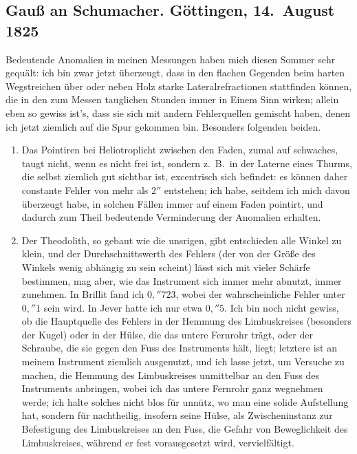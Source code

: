 \documentclass[12pt,a4paper]{article}
\theoremstyle{plain}
\theoremstyle{definition}
\theoremstyle{remark}
\begin{document}
\vfill
\eject

\subsection*{Gau\ss{} an Schumacher. G\"ottingen, 14.\ August 1825}

Bedeutende Anomalien in meinen Messungen haben mich diesen Sommer sehr gequ\"alt: ich bin zwar jetzt \"uberzeugt, dass in den flachen Gegenden beim harten Wegstreichen \"uber oder neben Holz starke Lateralrefractionen stattfinden k\"onnen, die in den zum Messen tauglichen Stunden immer in Einem Sinn wirken; allein eben so gewiss ist's, dass sie sich mit andern Fehlerquellen gemischt haben, denen ich jetzt ziemlich auf die Spur gekommen bin. Besonders folgenden beiden.

\begin{enumerate}[label=\arabic*)]
\item Das Pointiren bei Heliotroplicht zwischen den Faden, zumal auf schwaches, taugt nicht, wenn es nicht frei ist, sondern z.~B.\ in der Laterne eines Thurms, die selbst ziemlich gut sichtbar ist, excentrisch sich befindet: es k\"onnen daher constante Fehler von mehr als $2''$ entstehen; ich habe, seitdem ich mich davon \"uberzeugt habe, in solchen F\"allen immer auf einem Faden pointirt, und dadurch zum Theil bedeutende Verminderung der Anomalien erhalten.

\item Der Theodolith, so gebaut wie die unsrigen, gibt entschieden alle Winkel zu klein, und der Durchschnittswerth des Fehlers (der von der Gr\"o\ss e des Winkels wenig abh\"angig zu sein scheint) l\"asst sich mit vieler Sch\"arfe bestimmen, mag aber, wie das Instrument sich immer mehr abnutzt, immer zunehmen. In Brillit fand ich $0{,}\!''\!723$, wobei der wahrscheinliche Fehler unter $0{,}\!''\!1$ sein wird. In Jever hatte ich nur etwa $0{,}\!''\!5$. Ich bin noch nicht gewiss, ob die Hauptquelle des Fehlers in der Hemmung des Limbuskreises (besonders der Kugel) oder in der H\"ulse, die das untere Fernrohr tr\"agt, oder der Schraube, die sie gegen den Fuss des Instruments h\"alt, liegt; letztere ist an meinem Instrument ziemlich ausgenutzt, und ich lasse jetzt, um Versuche zu machen, die Hemmung des Limbuskreises unmittelbar an den Fuss des Instruments anbringen, wobei ich das untere Fernrohr ganz wegnehmen werde; ich halte solches nicht blos f\"ur unn\"utz, wo man eine solide Aufstellung hat, sondern f\"ur nachtheilig, insofern seine H\"ulse, als Zwischeninstanz zur Befestigung des Limbuskreises an den Fuss, die Gefahr von Beweglichkeit des Limbuskreises, w\"ahrend er fest vorausgesetzt wird, vervielf\"altigt.
\end{enumerate}
\end{document}
